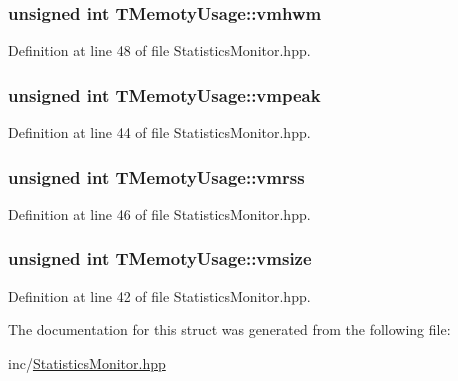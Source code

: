 \subsubsection[{vmhwm}]{\setlength{\rightskip}{0pt plus 5cm}unsigned int T\+Memoty\+Usage\+::vmhwm}\label{struct_t_memoty_usage_a66089e06d885f009f50872d8c0ccd3b3}


Definition at line 48 of file Statistics\+Monitor.\+hpp.

\hypertarget{struct_t_memoty_usage_a4d66cce3c91b795c15e9de158d2658f5}{}
\subsubsection[{vmpeak}]{\setlength{\rightskip}{0pt plus 5cm}unsigned int T\+Memoty\+Usage\+::vmpeak}\label{struct_t_memoty_usage_a4d66cce3c91b795c15e9de158d2658f5}


Definition at line 44 of file Statistics\+Monitor.\+hpp.

\hypertarget{struct_t_memoty_usage_a968cf005ed24343dd992ab89ab361686}{}
\subsubsection[{vmrss}]{\setlength{\rightskip}{0pt plus 5cm}unsigned int T\+Memoty\+Usage\+::vmrss}\label{struct_t_memoty_usage_a968cf005ed24343dd992ab89ab361686}


Definition at line 46 of file Statistics\+Monitor.\+hpp.

\hypertarget{struct_t_memoty_usage_a85cd99dcbca0d070abd2a5c3301375d4}{}
\subsubsection[{vmsize}]{\setlength{\rightskip}{0pt plus 5cm}unsigned int T\+Memoty\+Usage\+::vmsize}\label{struct_t_memoty_usage_a85cd99dcbca0d070abd2a5c3301375d4}


Definition at line 42 of file Statistics\+Monitor.\+hpp.



The documentation for this struct was generated from the following file\+:\begin{DoxyCompactItemize}
\item 
inc/\hyperlink{_statistics_monitor_8hpp}{Statistics\+Monitor.\+hpp}\end{DoxyCompactItemize}
